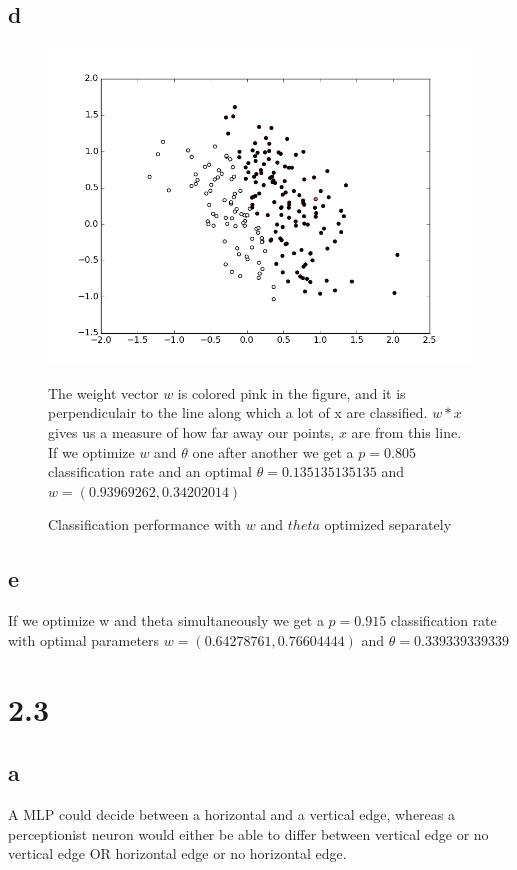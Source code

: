 \documentclass[11pt,a4paper]{article}
\begin{document}
\subsection*{d}
\begin{figure}[h]
  \begin{centering}
  \includegraphics[width=\textwidth]{separate.png}
  \caption{Classification performance with $w$ and $theta$ optimized separately}
  \end{centering}
The weight vector $w$ is colored pink in the figure, and it is perpendiculair to the line along which a lot of x are classified. $w*x$ gives us a measure of how far away our points, $x$ are from this line.
If we optimize $w$ and $\theta$ one after another we get a  $p = 0.805$  classification rate and an optimal $\theta = 0.135135135135$ and $w =  (0.93969262,  0.34202014)$
\end{figure}
\newpage
\subsection*{e}
If we optimize w and theta simultaneously we get a  $p = 0.915$ classification rate with optimal parameters $w = (0.64278761,  0.76604444)$ and $\theta = 0.339339339339$
\newpage
\section*{2.3}
\subsection*{a}
A MLP could decide between a horizontal and a vertical edge, whereas a perceptionist neuron would either be able to differ between
vertical edge or no vertical edge OR horizontal edge or no horizontal edge.
\end{document}
